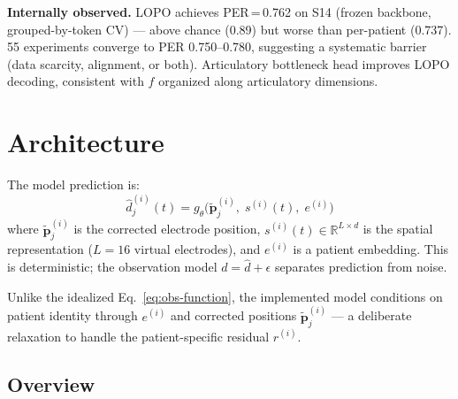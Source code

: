 \documentclass[11pt,letterpaper]{article}
\newcommand{\bfp}{\mathbf{p}}
\newcommand{\R}{\mathbb{R}}
\begin{document}
\textbf{Internally observed.}
LOPO achieves PER\,=\,0.762 on S14 (frozen backbone, grouped-by-token CV) --- above chance (0.89) but worse than per-patient (0.737).
55 experiments converge to PER 0.750--0.780, suggesting a systematic barrier (data scarcity, alignment, or both).
Articulatory bottleneck head improves LOPO decoding, consistent with $f$ organized along articulatory dimensions.



\section{Architecture}\label{sec:architecture}

The model prediction is:
\begin{equation}\label{eq:implemented}
\boxed{\hat{d}_j^{(i)}(t) = g_\theta\bigl(\tilde{\bfp}_j^{(i)},\; s^{(i)}(t),\; e^{(i)}\bigr)}
\end{equation}
where $\tilde{\bfp}_j^{(i)}$ is the corrected electrode position, $s^{(i)}(t) \in \R^{L \times d}$ is the spatial representation ($L{=}16$ virtual electrodes), and $e^{(i)}$ is a patient embedding. This is deterministic; the observation model $d = \hat{d} + \epsilon$ separates prediction from noise.

Unlike the idealized Eq.~\ref{eq:obs-function}, the implemented model conditions on patient identity through $e^{(i)}$ and corrected positions $\tilde{\bfp}_j^{(i)}$ --- a deliberate relaxation to handle the patient-specific residual $r^{(i)}$.

\subsection{Overview}
\end{document}
